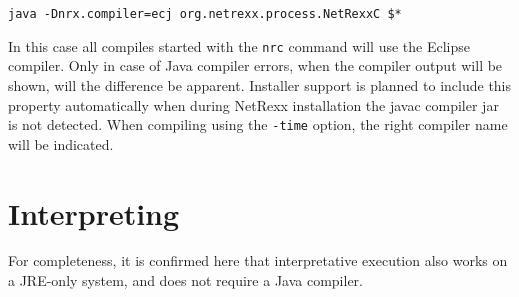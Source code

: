 \begin{verbatim}
java -Dnrx.compiler=ecj org.netrexx.process.NetRexxC $*
\end{verbatim}
 
In this case all compiles started with the \texttt{nrc} command will use the Eclipse compiler. Only in case of Java compiler errors, when the compiler output will be shown, will the difference be apparent. Installer support is planned to include this property automatically when during NetRexx installation the javac compiler jar is not detected. When compiling using the \texttt{-time} option, the right compiler name will be indicated.
 
\section{Interpreting}
For completeness, it is confirmed here that interpretative execution also works on a JRE-only system, and does not require a Java compiler.
 